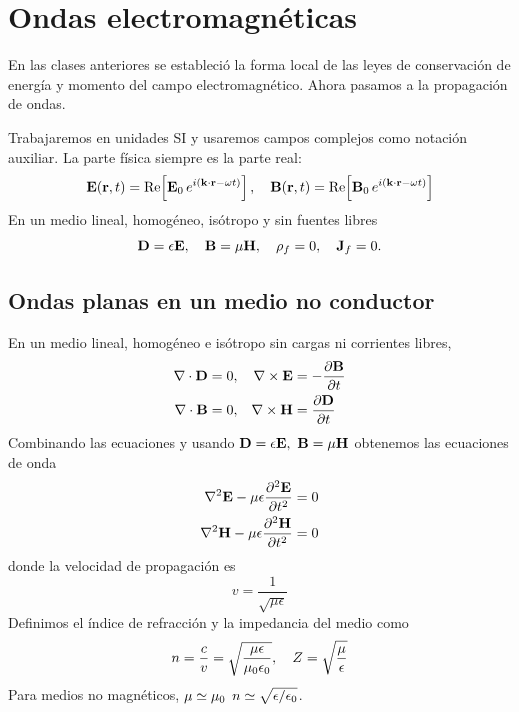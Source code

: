 \documentclass[]{article}
\numberwithin{equation}{section}
\begin{document}
\section{Ondas electromagnéticas}
En las clases anteriores se estableció la forma local de las leyes de conservación de energía y momento del campo electromagnético. Ahora pasamos a la propagación de ondas.

Trabajaremos en unidades SI y usaremos campos complejos como notación auxiliar. La parte física siempre es la parte real:
\begin{equation}
	\mathbf{E}(\mathbf{r},t) = \mathrm{Re}\!\left[\mathbf{E}_0 \, e^{i(\mathbf{k}\cdot\mathbf{r} - \omega t)}\right], \quad \mathbf{B}(\mathbf{r},t) = \mathrm{Re}\!\left[\mathbf{B}_0 \, e^{i(\mathbf{k}\cdot\mathbf{r} - \omega t)}\right]
\end{equation}
En un medio lineal, homogéneo, isótropo y sin fuentes libres
\begin{equation}
	\mathbf{D} = \epsilon \mathbf{E}, \quad \mathbf{B} = \mu \mathbf{H}, \quad \rho_f = 0, \quad \mathbf{J}_f = 0.
\end{equation}

\subsection{Ondas planas en un medio no conductor}
En un medio lineal, homogéneo e isótropo sin cargas ni corrientes libres,
\begin{align*}
	\nabla\cdot\mathbf{D} &= 0, & \nabla\times\mathbf{E} &= -\dfrac{\partial \mathbf{B}}{\partial t}\\
	\nabla\cdot\mathbf{B} &= 0, & \nabla\times\mathbf{H} &= \dfrac{\partial \mathbf{D}}{\partial t}
\end{align*}
Combinando las ecuaciones y usando $\mathbf{D} = \epsilon \mathbf{E}, ~ \mathbf{B} = \mu \mathbf{H}$ obtenemos las ecuaciones de onda
\begin{align}
	\nabla^2\mathbf{E} - \mu\epsilon\dfrac{\partial ^2\mathbf{E}}{\partial t^2} &= 0\\
	\nabla^2\mathbf{H} - \mu\epsilon\dfrac{\partial ^2\mathbf{H}}{\partial t^2} &= 0
\end{align}
donde la velocidad de propagación es
\begin{equation}
	v = \frac{1}{\sqrt{\mu\epsilon}}
\end{equation}
Definimos el índice de refracción y la impedancia del medio como
\begin{equation}
	n = \frac{c}{v} = \sqrt{\frac{\mu\epsilon}{\mu_{0}\epsilon_{0}}}, \quad Z = \sqrt{\frac{\mu}{\epsilon}}
\end{equation}
Para medios no magnéticos, $\mu \simeq \mu_{0}$ $n \simeq \sqrt{\epsilon/\epsilon_{0}}$.
\end{document}
